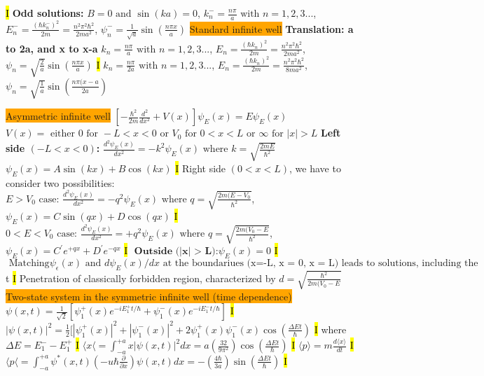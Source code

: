\documentclass[fontsize=4pt]{scrartcl}
\begin{document}
\hl{I}
\textbf{Odd solutions:} $B = 0 \text{ and } \sin(ka) = 0$,
$k_{n}^{-} = \frac{n\pi}{a} \text { with } n = 1,2,3...$, $E_n^{-}  = \frac{(\hbar k_n^{-})^2}{2m} = \frac{n^2 \pi^2 \hbar^2}{2ma^2}$, $\psi_n^{-} = \frac{1}{\sqrt{a}}\sin (\frac{n\pi x}{a})$
\colorbox{Orange}{Standard infinite well}
\textbf{Translation: a to 2a, and x to x-a}
$k_{n} = \frac{n\pi}{a} \text { with } n = 1,2,3...$, $E_n  = \frac{(\hbar k_n)^2}{2m} = \frac{n^2 \pi^2 \hbar^2}{2ma^2}$, $\psi_n= \sqrt{\frac{2}{a}}\sin (\frac{n\pi x}{a})$
\hl{I}
$k_{n} = \frac{n\pi}{2a} \text { with } n = 1,2,3...$, $E_n  = \frac{(\hbar k_n)^2}{2m} = \frac{n^2 \pi^2 \hbar^2}{8ma^2}$, $\psi_n= \sqrt{\frac{1}{a}}\sin (\frac{n\pi (x-a}{2a})$

\colorbox{Orange}{Asymmetric infinite well}
$[-\frac{\hbar^2}{2m}\frac{d^2}{dx^2}+V(x)] \psi_{E}(x) = E\psi_{E}(x)$
$V(x) =\text{ either } 0 \text { for } -L < x < 0 \text{ or } V_0 \text { for } 0<x<L \text{ or } \infty \text { for } |x| > L$
\textbf{Left side $(-L < x <0)$:}
$\frac{d^2 \psi_E (x)}{dx^2} = -k^2 \psi_E (x)\text{ where } k = \sqrt{\frac{2mE}{\hbar^2}}$
$\psi_E(x) = A\sin(kx) + B\cos(kx)$
\hl{I}
Right side $(0<x<L)$, we have to consider two possibilities:
$E > V_0 \text{ case: } \frac{d^2 \psi_E (x)}{dx^2} = -q^2 \psi_E (x) \text{ where } q = \sqrt{\frac{2m(E-V_0}{\hbar^2}}$,
$\psi_E (x) = C\sin(qx) + D\cos(qx)$
\hl{I}
$0<E < V_0 \text{ case: } \frac{d^2 \psi_E (x)}{dx^2} = +q^2 \psi_E (x) \text{ where } q = \sqrt{\frac{2m(V_0-E}{\hbar^2}}$,
$\psi_E (x) = C^{\prime}e^{+qx} + D^{\prime}e^{-qx}$
\hl{I}
$\textbf{ Outside (|x| > L):} \psi_E(x) = 0$
\hl{I}
$\text{ Matching} \psi_{\epsilon}(x) \text{ and } d\psi_E(x)/dx \text{ at the boundariues (x=-L, x = 0, x = L) leads to solutions, including the quantization of energy}$t
\hl{I}
Penetration of classically forbidden region, characterized by $d = \sqrt{\frac{\hbar^2}{2m(V_0 - E}}$
\colorbox{Orange}{Two-state system in the symmetric infinite well (time dependence)}
$\psi(x,t) = \frac{1}{\sqrt{2}}[\psi_1^+ (x) e^{-iE_1^+  t/\hbar} +\psi_1^- (x) e^{-iE_1^- t/\hbar} ]$
\hl{I}
$|\psi(x,t)|^2 = \frac{1}{2}[ |\psi_1^+ (x)|^2 + |\psi_1^- (x)|^2 + 2\psi_1^+(x)\psi_1^-(x)\cos(\frac{\Delta E t}{\hbar})$
\hl{I}
where $\Delta E = E_1^- - E_1^+$
\hl{I}
$\langle x \langle = \int_{-a}^{+a} x |\psi (x,t)|^2 dx = a(\frac{32}{9\pi^2})\cos(\frac{\Delta Et}{\hbar})$
\hl{I}
$\langle p \rangle = m\frac{d\langle x \rangle}{dt}$
\hl{I}
$\langle p \langle = \int_{-a}^{+a} \psi^*(x,t)(-u\hbar \frac{\partial}{\partial x}) \psi(x,t) dx = -(\frac{4\hbar}{3a})\sin(\frac{\Delta E t}{\hbar})$
\hl{I}
\end{document}
